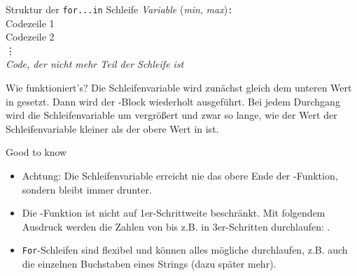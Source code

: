 \begin{frame}

	\renewcommand{\baselinestretch}{1.5}
	\begin{block}{Struktur der \texttt{for...in} Schleife}
		\vspace{2pt}
		\pause {} \pause \textit{Variable} \pause {} \pause {}(\textit{min}, \textit{max})\pause\texttt{:} \pause \\
		\spacechar\spacechar Codezeile 1 \pause \\ 
\spacechar\spacechar Codezeile 2 \pause \\
\spacechar\spacechar \phantom{Code} \vdots \pause  \\
\textit{Code, der nicht mehr Teil der Schleife ist}
	\end{block}

\vspace{12pt}
\pause 

	\renewcommand{\baselinestretch}{1}
	\begin{block}{Wie funktioniert's?}
		\vspace{2pt}
	Die Schleifenvariable wird zunächst gleich dem unteren Wert in  gesetzt. Dann wird der -Block wiederholt ausgeführt. Bei jedem Durchgang wird die Schleifenvariable um  vergrößert und zwar so lange, wie der Wert der Schleifenvariable kleiner als der obere Wert in  ist. 	
	\end{block}
\end{frame}

\begin{frame}
\begin{block}{Good to know}
	\pause
	\begin{itemize}[<+->]
		\item Achtung: Die Schleifenvariable erreicht nie das obere Ende der -Funktion, sondern bleibt immer  drunter. 
		\item Die -Funktion ist nicht auf 1er-Schrittweite beschränkt. Mit folgendem Ausdruck werden die Zahlen von  bis  z.B. in 3er-Schritten durchlaufen: . 
		\item \texttt{For}-Schleifen sind flexibel und können alles mögliche durchlaufen, z.B. auch die einzelnen Buchstaben eines Strings (dazu später mehr).
	\end{itemize}
\end{block}
\end{frame}

